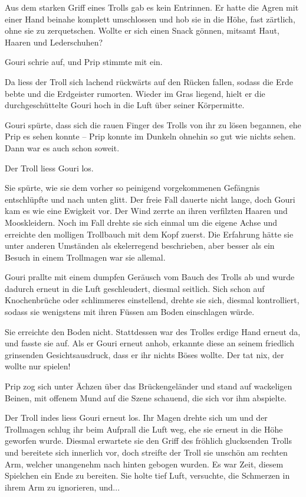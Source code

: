 \documentclass[10pt, a4paper, oneside]{book}
\begin{document}
Aus dem starken Griff eines Trolls gab es kein Entrinnen. Er hatte die Agren mit einer Hand beinahe komplett umschlossen und hob sie in die Höhe, fast zärtlich, ohne sie zu zerquetschen. Wollte er sich einen Snack gönnen, mitsamt Haut, Haaren und Lederschuhen?

Gouri schrie auf, und Prip stimmte mit ein.

Da liess der Troll sich lachend rückwärts auf den Rücken fallen, sodass die Erde bebte und die Erdgeister rumorten. Wieder im Gras liegend, hielt er die durchgeschüttelte Gouri hoch in die Luft über seiner Körpermitte.

Gouri spürte, dass sich die rauen Finger des Trolls von ihr zu lösen begannen, ehe Prip es sehen konnte – Prip konnte im Dunkeln ohnehin so gut wie nichts sehen. Dann war es auch schon soweit.

Der Troll liess Gouri los.

Sie spürte, wie sie dem vorher so peinigend vorgekommenen Gefängnis entschlüpfte und nach unten glitt. Der freie Fall dauerte nicht lange, doch Gouri kam es wie eine Ewigkeit vor. Der Wind zerrte an ihren verfilzten Haaren und Mooskleidern. Noch im Fall drehte sie sich einmal um die eigene Achse und erreichte den molligen Trollbauch mit dem Kopf zuerst. Die Erfahrung hätte sie unter anderen Umständen als ekelerregend beschrieben, aber besser als ein Besuch in einem Trollmagen war sie allemal.

Gouri prallte mit einem dumpfen Geräusch vom Bauch des Trolls ab und wurde dadurch erneut in die Luft geschleudert, diesmal seitlich. Sich schon auf Knochenbrüche oder schlimmeres einstellend, drehte sie sich, diesmal kontrolliert, sodass sie wenigstens mit ihren Füssen am Boden einschlagen würde.

Sie erreichte den Boden nicht. Stattdessen war des Trolles erdige Hand erneut da, und fasste sie auf. Als er Gouri erneut anhob, erkannte diese an seinem friedlich grinsenden Gesichtsausdruck, dass er ihr nichts Böses wollte. Der tat nix, der wollte nur spielen!

Prip zog sich unter Ächzen über das Brückengeländer und stand auf wackeligen Beinen, mit offenem Mund auf die Szene schauend, die sich vor ihm abspielte.

Der Troll indes liess Gouri erneut los. Ihr Magen drehte sich um und der Trollmagen schlug ihr beim Aufprall die Luft weg, ehe sie erneut in die Höhe geworfen wurde. Diesmal erwartete sie den Griff des fröhlich glucksenden Trolls und bereitete sich innerlich vor, doch streifte der Troll sie unschön am rechten Arm, welcher unangenehm nach hinten gebogen wurden. Es war Zeit, diesem Spielchen ein Ende zu bereiten. Sie holte tief Luft, versuchte, die Schmerzen in ihrem Arm zu ignorieren, und...
\end{document}
